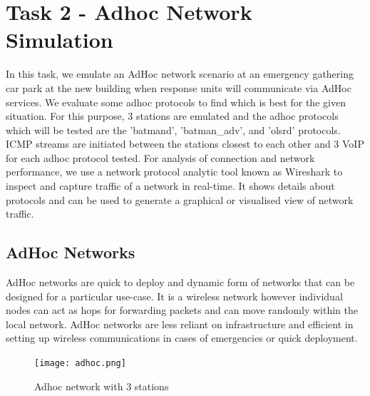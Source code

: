 \documentclass{article}
\begin{document}
\section{Task 2 - Adhoc Network Simulation}
In this task, we emulate an AdHoc network scenario at an emergency gathering car park at the new building when response units will communicate via AdHoc services. We evaluate some adhoc protocols to find which is best for the given situation. For this purpose, 3 stations are emulated and the adhoc protocols which will be tested are the 'batmand', 'batman\_adv', and 'olsrd' protocols. ICMP streams are initiated between the stations closest to each other and 3 VoIP for each adhoc protocol tested. For analysis of connection and network performance, we use a network protocol analytic tool known as Wireshark to inspect and capture traffic of a network in real-time. It shows details about protocols and can be used to generate a graphical or visualised view of network traffic.
\subsection{AdHoc Networks}
AdHoc\cite{1010101} networks are quick to deploy and dynamic form of networks that can be designed for a particular use-case. It is a wireless network however individual nodes can act as hops for forwarding packets and can move randomly within the local network. AdHoc networks are less reliant on infrastructure and efficient in setting up wireless communications in cases of emergencies or quick deployment.
    	\begin{figure}[h]
        		\centering
        		\texttt{[image: adhoc.png]}
        		\caption{Adhoc network with 3 stations}
        		\label{fig:t2-1}
    	\end{figure}
\end{document}
